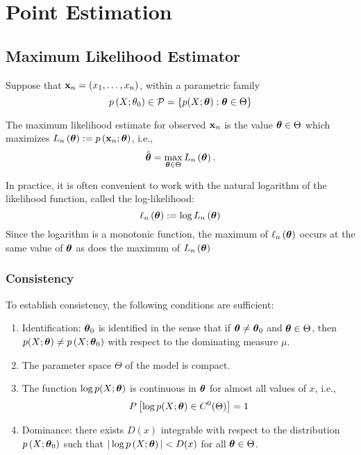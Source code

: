 \chapter{Point Estimation}

\section{Maximum Likelihood Estimator}

Suppose that \(\mathbf{x}_{n}=\left(x_{1},\ldots,x_{n}\right)\), within a parametric family
\begin{equation*}
	p\left(X;\theta_{0}\right)\in\mathcal{P}=\left\{p(X;\boldsymbol{\theta}):\boldsymbol{\theta}\in\Theta\right\}
\end{equation*}

The maximum likelihood estimate for observed \(\mathbf{x}_{n}\) is the value \(\boldsymbol{\theta}\in\Theta\) which maximizes \(L_{n}\left(\boldsymbol{\theta}\right):=p\left(\mathbf{x}_{n};\boldsymbol{\theta}\right)\), i.e.,
\begin{equation}
	\hat{\boldsymbol{\theta}}=\max_{\boldsymbol{\theta}\in\Theta}L_{n}\left(\boldsymbol{\theta}\right).
\end{equation}

In practice, it is often convenient to work with the natural logarithm of the likelihood function, called the log-likelihood:
\begin{equation*}
	\ell_{n}\left(\boldsymbol{\theta}\right):=\log L_{n}\left(\boldsymbol{\theta}\right)
\end{equation*}
Since the logarithm is a monotonic function, the maximum of \(\ell_{n}\left(\boldsymbol{\theta}\right)\) occurs at the same value of \(\boldsymbol{\theta}\) as does the maximum of \(L_{n}\left(\boldsymbol{\theta}\right)\)

\subsection{Consistency}

To establish consistency, the following conditions are sufficient:
\begin{enumerate}[label = (C\arabic*)]
	\item Identification: \(\boldsymbol{\theta}_{0}\) is identified in the sense that if \(\boldsymbol{\theta}\neq\boldsymbol{\theta}_{0}\) and \(\boldsymbol{\theta}\in\Theta\), then \(p(X;\boldsymbol{\theta})\neq p\left(X;\boldsymbol{\theta}_{0}\right)\) with respect to the dominating measure \(\mu\).
	\item\label{cond:mle-compactness}
	      The parameter space \(\Theta\) of the model is compact.
	\item\label{cond:mle-continuity}
	      The function \(\log p(X;\boldsymbol{\theta})\) is continuous in \(\boldsymbol{\theta}\) for almost all values of \(x\), i.e.,
	      \begin{equation}
		      P\left[\log p(X;\boldsymbol{\theta})\in C^{0}(\Theta)\right]=1
	      \end{equation}
	\item Dominance: there exists \(D(x)\) integrable with respect to the distribution \(p\left(X;\boldsymbol{\theta}_{0}\right)\) such that \(|\log p\left(X;\boldsymbol{\theta}\right)|<D(x)\) for all \(\boldsymbol{\theta}\in\Theta\).
\end{enumerate}

